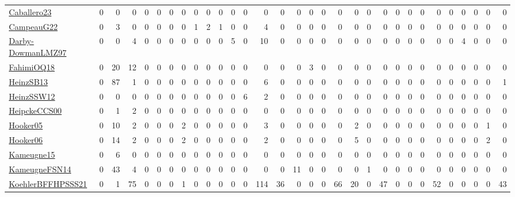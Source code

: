 \documentclass[a4paper]{article}
\begin{document}
{\begin{longtable}{l*{30}{r}}
\href{articles/Caballero23.pdf}{Caballero23}~\cite{Caballero23} & 0 & 0 & 0 & 0 & 0 & 0 & 0 & 0 & 0 & 0 & 0 & 0 & 0 & 0 & 0 & 0 & 0 & 0 & 0 & 0 & 0 & 0 & 0 & 0 & 0 & 0 & 0 & 0 & 0 & 0\\
\href{articles/CampeauG22.pdf}{CampeauG22}~\cite{CampeauG22} & 0 & 3 & 0 & 0 & 0 & 0 & 0 & 1 & 2 & 1 & 0 & 0 & 4 & 0 & 0 & 0 & 0 & 0 & 0 & 0 & 0 & 0 & 0 & 0 & 0 & 0 & 0 & 0 & 0 & 0\\
\href{articles/Darby-DowmanLMZ97.pdf}{Darby-DowmanLMZ97}~\cite{Darby-DowmanLMZ97} & 0 & 0 & 4 & 0 & 0 & 0 & 0 & 0 & 0 & 0 & 5 & 0 & 10 & 0 & 0 & 0 & 0 & 0 & 0 & 0 & 0 & 0 & 0 & 0 & 0 & 0 & 4 & 0 & 0 & 0\\
\href{articles/FahimiOQ18.pdf}{FahimiOQ18}~\cite{FahimiOQ18} & 0 & 20 & 12 & 0 & 0 & 0 & 0 & 0 & 0 & 0 & 0 & 0 & 0 & 0 & 0 & 3 & 0 & 0 & 0 & 0 & 0 & 0 & 0 & 0 & 0 & 0 & 0 & 0 & 0 & 0\\
\href{articles/HeinzSB13.pdf}{HeinzSB13}~\cite{HeinzSB13} & 0 & 87 & 1 & 0 & 0 & 0 & 0 & 0 & 0 & 0 & 0 & 0 & 6 & 0 & 0 & 0 & 0 & 0 & 0 & 0 & 0 & 0 & 0 & 0 & 0 & 0 & 0 & 0 & 0 & 1\\
\href{articles/HeinzSSW12.pdf}{HeinzSSW12}~\cite{HeinzSSW12} & 0 & 0 & 0 & 0 & 0 & 0 & 0 & 0 & 0 & 0 & 0 & 6 & 2 & 0 & 0 & 0 & 0 & 0 & 0 & 0 & 0 & 0 & 0 & 0 & 0 & 0 & 0 & 0 & 0 & 0\\
\href{articles/HeipckeCCS00.pdf}{HeipckeCCS00}~\cite{HeipckeCCS00} & 0 & 1 & 2 & 0 & 0 & 0 & 0 & 0 & 0 & 0 & 0 & 0 & 0 & 0 & 0 & 0 & 0 & 0 & 0 & 0 & 0 & 0 & 0 & 0 & 0 & 0 & 0 & 0 & 0 & 0\\
\href{articles/Hooker05.pdf}{Hooker05}~\cite{Hooker05} & 0 & 10 & 2 & 0 & 0 & 0 & 2 & 0 & 0 & 0 & 0 & 0 & 3 & 0 & 0 & 0 & 0 & 0 & 2 & 0 & 0 & 0 & 0 & 0 & 0 & 0 & 0 & 0 & 1 & 0\\
\href{articles/Hooker06.pdf}{Hooker06}~\cite{Hooker06} & 0 & 14 & 2 & 0 & 0 & 0 & 2 & 0 & 0 & 0 & 0 & 0 & 2 & 0 & 0 & 0 & 0 & 0 & 5 & 0 & 0 & 0 & 0 & 0 & 0 & 0 & 0 & 0 & 2 & 0\\
\href{articles/Kameugne15.pdf}{Kameugne15}~\cite{Kameugne15} & 0 & 6 & 0 & 0 & 0 & 0 & 0 & 0 & 0 & 0 & 0 & 0 & 0 & 0 & 0 & 0 & 0 & 0 & 0 & 0 & 0 & 0 & 0 & 0 & 0 & 0 & 0 & 0 & 0 & 0\\
\href{articles/KameugneFSN14.pdf}{KameugneFSN14}~\cite{KameugneFSN14} & 0 & 43 & 4 & 0 & 0 & 0 & 0 & 0 & 0 & 0 & 0 & 0 & 0 & 0 & 11 & 0 & 0 & 0 & 0 & 1 & 0 & 0 & 0 & 0 & 0 & 0 & 0 & 0 & 0 & 0\\
\href{articles/KoehlerBFFHPSSS21.pdf}{KoehlerBFFHPSSS21}~\cite{KoehlerBFFHPSSS21} & 0 & 1 & 75 & 0 & 0 & 0 & 1 & 0 & 0 & 0 & 0 & 0 & 114 & 36 & 0 & 0 & 0 & 66 & 20 & 0 & 47 & 0 & 0 & 0 & 52 & 0 & 0 & 0 & 0 & 43\\

\end{longtable}}
\end{document}
